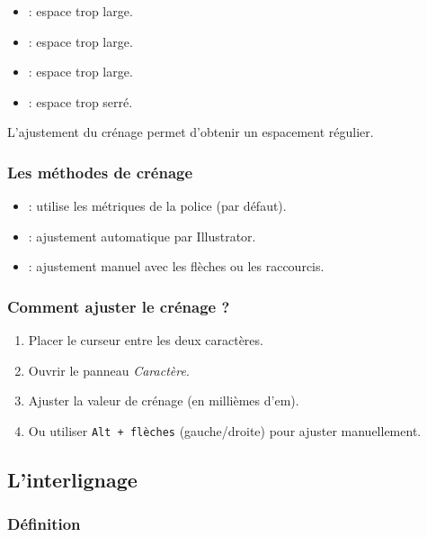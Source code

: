 \begin{itemize}
    \item {} : espace trop large.
    \item {} : espace trop large.
    \item {} : espace trop large.
    \item {} : espace trop serré.
\end{itemize}

L'ajustement du crénage permet d'obtenir un espacement régulier.

\subsubsection{Les méthodes de crénage}

\begin{itemize}
    \item {} : utilise les métriques de la police (par défaut).
    \item {} : ajustement automatique par Illustrator.
    \item {} : ajustement manuel avec les flèches ou les raccourcis.
\end{itemize}

\subsubsection{Comment ajuster le crénage ?}

\begin{enumerate}
    \item Placer le curseur entre les deux caractères.
    \item Ouvrir le panneau \emph{Caractère}.
    \item Ajuster la valeur de crénage (en millièmes d'em).
    \item Ou utiliser \texttt{Alt + flèches} (gauche/droite) pour ajuster manuellement.
\end{enumerate}

\subsection{L'interlignage}

\subsubsection{Définition}

